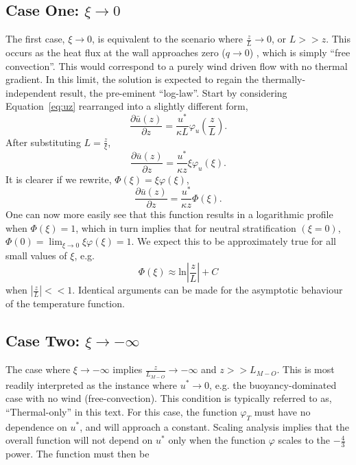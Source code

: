 \subsection*{Case One: $\xi \to 0$}
The first case, $\xi \to 0$, is equivalent to the scenario where
$\frac{z}{L} \to 0$, or $L>>z$. This occurs as the heat flux at the wall
approaches zero ($q \to 0$) , which is simply ``free convection''. This
would correspond to a purely wind driven flow with no thermal gradient.
In this limit, the solution is expected to regain the thermally-independent
result, the pre-eminent ``log-law''. Start by considering Equation~\ref{eq:uz}
rearranged into a slightly different form, 
\begin{equation}
 \frac{\partial \bar u(z)}{\partial z} = \frac{u^*}{\kappa L} \varphi_u(\frac{z}{L}).
\end{equation}
After substituting $L=\frac{z}{\xi}$, 
\begin{equation}
 \frac{\partial \bar u(z)}{\partial z} = \frac{u^*}{\kappa z} \xi \varphi_u(\xi).
\end{equation}
It is clearer if we rewrite, $\Phi(\xi) = \xi \varphi(\xi)$, 
\begin{equation}
 \frac{\partial \bar u(z)}{\partial z} = \frac{u^*}{\kappa z} \Phi(\xi).
\end{equation}
One can now more easily see that this function results in a logarithmic
profile when $\Phi(\xi) = 1$, which in turn implies that for neutral
stratification $(\xi = 0)$, $\Phi(0) = \lim_{\xi \to 0} \xi \varphi(\xi)
= 1$. We expect this to be approximately true for all small values of
$\xi$, e.g. 
\begin{equation}
 \Phi(\xi) \approx \text{ln}| \frac{z}{L}| + C 
\end{equation}
 when $ |\frac{z}{L}| << 1$. Identical arguments can be made for the
 asymptotic behaviour of the temperature function.

\subsection*{Case Two: $\xi \to -\infty$}

The case where $\xi \to -\infty $ implies $\frac{z}{L_{M-O}} \to
-\infty $ and $z>>L_{M-O}$. This is most readily interpreted as the instance
where $u^* \to 0$, e.g. the buoyancy-dominated case with no wind
(free-convection). This condition is typically referred to as,
``Thermal-only'' in this text. 
For this case, the function $\varphi_T$ must have no
dependence on $u^*$, and will approach a constant. Scaling
analysis implies that the overall function will not depend on $u^*$ only
when the function $\varphi$ scales to the $-\frac{4}{3}$ power. The
function must then be

